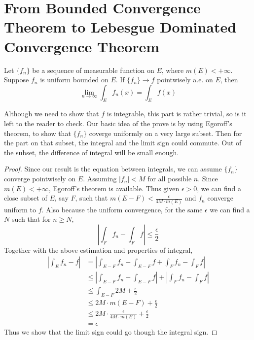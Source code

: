 \documentclass[lang=en, 12pt]{elegantbook}
\begin{document}
    \section{From Bounded Convergence Theorem to Lebesgue Dominated Convergence Theorem}    
        \begin{theorem}
            Let $\{f_n\}$ be a sequence of measurable function on $E$, where $m(E)<+\infty$. Suppose $f_n$ is uniform bounded on $E$. 
        If $\{f_n\} \to f$ pointwisely a.e. on $E$, then 
        $$\lim_{n \to \infty} \int_E f_n(x) = \int_E f(x) $$
        \end{theorem}\par
            Although we need to show that $f$ is integrable, this part is rather trivial, so is it left to the reader to check.
            Our basic idea of the prove is by using Egoroff's theorem, to show that $\{f_n\}$ coverge uniformly on a very large subset.
        Then for the part on that subset, the integral and the limit sign could commute. Out of the subset, the difference of integral 
        will be small enough.
        \begin{proof}
            Since our result is the equation between integrals, we can assume $\{f_n\}$ converge pointwisely on $E$. Assuming $|f_n| < M$ 
        for all possible $n$. Since $m(E)< +\infty$, Egoroff's theorem is available. Thus given $\epsilon >0 $, 
        we can find a close subset of $E$, say $F$, such that $m(E - F) < \frac{\epsilon}{ 4M \cdot m(E) }$  and $f_n$ converge uniform to 
        $f$. Also because the uniform convergence, for the same $\epsilon$ we can find a $N$ such that for $n\geq N$, 
        $$|\int_F f_n -\int_F f| \leq \frac{\epsilon}{2}$$
        Together with the above estimation and properties of integral,
            \begin{equation*}
                \begin{aligned}
                    |\int_E f_n - f| &= |\int_{E-F} f_n - \int_{E-F} f + \int_{F} f_n -\int_{F} f|\\
                    &\leq |\int_{E-F} f_n - \int_{E-F} f| + |\int_{F} f_n -\int_{F} f|\\
                    &\leq \int_{E-F} 2M  + \frac{\epsilon}{2}\\
                    &\leq 2M \cdot m(E-F) +\frac{\epsilon}{2}\\
                    &\leq 2M \cdot \frac{\epsilon}{ 4M \cdot m(E) } +\frac{\epsilon}{2}\\
                    &= \epsilon
                \end{aligned}
            \end{equation*}
        Thus we show that the limit sign could go though the integral sign.
        \end{proof}
\end{document}
